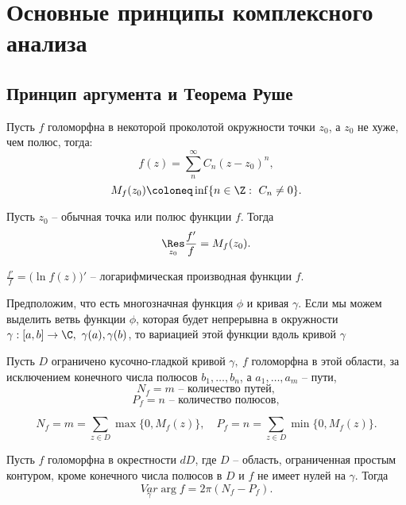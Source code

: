 

\section{Основные принципы комплексного анализа}

\subsection{Принцип аргумента и Теорема Руше}

\begin{definition}
	Пусть $f$ голоморфна в некоторой проколотой окружности точки $z_0$, а $z_0$ не хуже, чем полюс, тогда:
	\[
		f(z) = \sum_{n}^{\infty } C_n (z-z_0)^n,
	\]
	\[
		M_f(z_0) \coloneq \inf \{n \in \Z: \ C_n \ne 0\}.
	\]
\end{definition}

\begin{lemma}
	Пусть $z_0$ -- обычная точка или полюс функции $f$. Тогда
	\[
		\underset{z_0}{\Res} \frac{f'}{f} = M_f(z_0).
	\]
\end{lemma}

\begin{note}
	$\frac{f'}{f} = \big(\ln f(z)\big)' $ -- логарифмическая производная функции $f$.
\end{note}

\begin{remark}
	Предположим, что есть многозначная функция $\phi $ и кривая $\gamma $. Если мы можем выделить ветвь функции $\phi $, которая будет непрерывна в окружности $\gamma : [a,b] \rightarrow \C, \ \gamma (a), \gamma (b)$, то вариацией этой функции вдоль кривой $\gamma $
\end{remark}

\begin{remark}
	Пусть $D$ ограничено кусочно-гладкой кривой $\gamma , \ f$ голоморфна в этой области, за исключением конечного числа полюсов $b_1,\ldots ,b_n$, а $a_1,\ldots ,a_m$ -- пути,
	\[
		N_f = m \text{ -- количество путей},
	\]
	\[
		P_f = n \text{ -- количество полюсов},
	\]

	\[
		N_f = m = \sum_{z \in D} \max \{0,M_f(z)\}, \quad P_f = n = \sum_{z \in D} \min \{0,M_f(z)\}.
	\]
\end{remark}

\begin{theorem}
	Пусть $f$ голоморфна в окрестности $dD$, где $D$ -- область, ограниченная простым контуром, кроме конечного числа полюсов в $D$ и $f$ не имеет нулей на $\gamma $. Тогда
	\[
		\underset{\gamma }{Var} \arg f = 2\pi (N_f - P_f).
	\]
\end{theorem}

